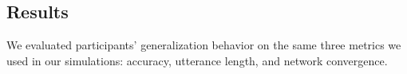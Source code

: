 \subsection{Results}

We evaluated participants' generalization behavior on the same three metrics we used in our simulations: accuracy, utterance length, and network convergence.

%
%
%

